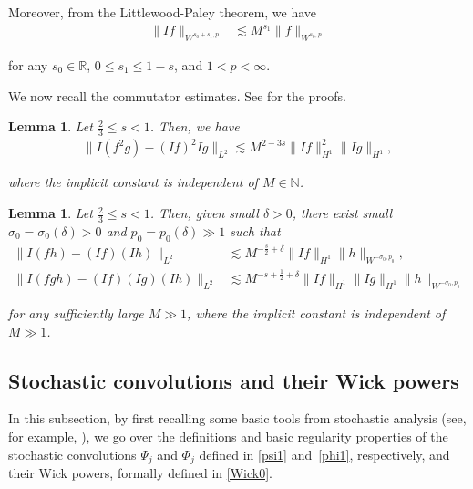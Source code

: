 \documentclass[letterpaper, 11pt,  reqno]{amsart}
\newtheorem{lemma}[theorem]{Lemma}
\newcommand{\1}{\hspace{0.5mm}\text{I}\hspace{0.2mm}}
\newcommand{\noi}{\noindent}
\newcommand{\R}{\mathbb{R}}
\newcommand{\N}{\mathbb{N}}
\newcommand{\dl}{\delta}
\newcommand{\les}{\lesssim}
\numberwithin{equation}{section}
\numberwithin{theorem}{section}
\begin{document}
\noi
Moreover, 
 from the Littlewood-Paley theorem, we have
\begin{align}
\| I f \|_{W^{s_0 + s_1, p}} & \les M^{s_1} \| f \|_{W^{s_0, p}}
\label{I4}
\end{align}


\noi
for any $s_0 \in \R$, $0 \leq s_1 \leq 1-s$, and $1 < p < \infty$.


We now recall the commutator estimates.
See  \cite[Lemmas~3.1 and~3.3]{GKOT}
for the proofs.

\begin{lemma} 
\label{LEM:com1}
Let $\frac 23 \le s < 1$. Then, we have 
\begin{align*}
\|   I ( f^2 g ) - ( I f )^2 I g\|_{L^2} \les M^{2-  3s} \| I f \|_{H^1}^2 \| I g \|_{H^1}, 
\end{align*}


\noi
where the implicit constant is independent of $M \in \N$.

\end{lemma}



\begin{lemma}
\label{LEM:com2} 
Let $\frac 23 \le s < 1$.
 Then, given small $\dl > 0$,  there exist small $\sigma_0 = \sigma_0(\dl) >0$ and $p_0 = p_0 (\dl) \gg 1$ such that 
\begin{align*} 
\| I ( f h) - (I f)( I h) \|_{L^2} 
& \les M^{-\frac {s}{2}  +\dl} \| I f \|_{H^1} \| h \|_{W^{-\sigma_0, p_0}}, \\
\| I ( f g h) - (I f)( I g )(I h) \|_{L^2}
&  \les M^{- s + \frac 12  + \dl} \| I f \|_{H^1} \| I g \|_{H^1} \| h \|_{W^{-\sigma_0, p_0}}
\end{align*}


\noi
for any sufficiently large $M \gg 1$, 
where the implicit constant is independent of 
$M \gg 1$.


\end{lemma} 






\subsection{Stochastic convolutions
and their Wick powers}
\label{SUBSEC:2.4}


In this subsection, 
by first recalling some basic tools from stochastic analysis
(see, for example, \cite{Simon, Kuo, Nua}), 
we 
go over the definitions 
and basic regularity properties of 
the stochastic convolutions $\Psi_j$  and $\Phi_j$ 
defined in \eqref{psi1} and~\eqref{phi1}, respectively, 
and their Wick powers, 
formally defined in \eqref{Wick0}.
\end{document}

